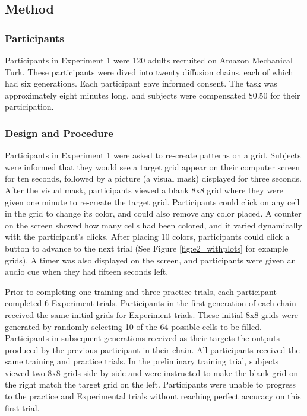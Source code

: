 \documentclass[10pt, letterpaper]{article}
\begin{document}
\hypertarget{method}{%
\subsection{Method}\label{method}}

\hypertarget{participants}{%
\subsubsection{Participants}\label{participants}}

Participants in Experiment 1 were 120 adults recruited on Amazon
Mechanical Turk. These participants were dived into twenty diffusion
chains, each of which had six generations. Each participant gave
informed consent. The task was approximately eight minutes long, and
subjects were compensated \$0.50 for their participation.

\hypertarget{design-and-procedure}{%
\subsubsection{Design and Procedure}\label{design-and-procedure}}

Participants in Experiment 1 were asked to re-create patterns on a grid.
Subjects were informed that they would see a target grid appear on their
computer screen for ten seconds, followed by a picture (a visual mask)
displayed for three seconds. After the visual mask, participants viewed
a blank 8x8 grid where they were given one minute to re-create the
target grid. Participants could click on any cell in the grid to change
its color, and could also remove any color placed. A counter on the
screen showed how many cells had been colored, and it varied dynamically
with the participant's clicks. After placing 10 colors, participants
could click a button to advance to the next trial (See Figure
\ref{fig:e2_withplots} for example grids). A timer was also displayed on
the screen, and participants were given an audio cue when they had
fifteen seconds left.

Prior to completing one training and three practice trials, each
participant completed 6 Experiment trials. Participants in the first
generation of each chain received the same initial grids for Experiment
trials. These initial 8x8 grids were generated by randomly selecting 10
of the 64 possible cells to be filled. Participants in subsequent
generations received as their targets the outputs produced by the
previous participant in their chain. All participants received the same
training and practice trials. In the preliminary training trial,
subjects viewed two 8x8 grids side-by-side and were instructed to make
the blank grid on the right match the target grid on the left.
Participants were unable to progress to the practice and Experimental
trials without reaching perfect accuracy on this first trial.
\end{document}
